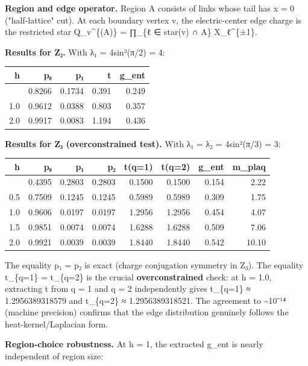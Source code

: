 \textbf{Region and edge operator.} Region A consists of links whose tail has x = 0 ("half-lattice" cut). At each boundary vertex v, the electric-center edge charge is the restricted star Q\_v\^{}\{(A)\} = ∏\_\{ℓ ∈ star(v) ∩ A\} X\_ℓ\^{}\{±1\}.

\textbf{Results for Z₂.} With λ₁ = 4sin²(π/2) = 4:

{\def\LTcaptype{none} %
\begin{longtable}[]{@{}rrrrr@{}}
\toprule\noalign{}
h & p₀ & p₁ & t & g\_ent \\
\midrule\noalign{}
\endhead
\bottomrule\noalign{}
\endlastfoot
0.5 & 0.8266 & 0.1734 & 0.391 & 0.249 \\
1.0 & 0.9612 & 0.0388 & 0.803 & 0.357 \\
2.0 & 0.9917 & 0.0083 & 1.194 & 0.436 \\
\end{longtable}
}

\textbf{Results for Z₃ (overconstrained test).} With λ₁ = λ₂ = 4sin²(π/3) = 3:

{\def\LTcaptype{none} %
\begin{longtable}[]{@{}rrrrrrrr@{}}
\toprule\noalign{}
h & p₀ & p₁ & p₂ & t(q=1) & t(q=2) & g\_ent & m\_plaq \\
\midrule\noalign{}
\endhead
\bottomrule\noalign{}
\endlastfoot
0.2 & 0.4395 & 0.2803 & 0.2803 & 0.1500 & 0.1500 & 0.154 & 2.22 \\
0.5 & 0.7509 & 0.1245 & 0.1245 & 0.5989 & 0.5989 & 0.309 & 1.75 \\
1.0 & 0.9606 & 0.0197 & 0.0197 & 1.2956 & 1.2956 & 0.454 & 4.07 \\
1.5 & 0.9851 & 0.0074 & 0.0074 & 1.6288 & 1.6288 & 0.509 & 7.06 \\
2.0 & 0.9921 & 0.0039 & 0.0039 & 1.8440 & 1.8440 & 0.542 & 10.10 \\
\end{longtable}
}

The equality p₁ = p₂ is exact (charge conjugation symmetry in Z₃). The equality t\_\{q=1\} = t\_\{q=2\} is the crucial \textbf{overconstrained} check: at h = 1.0, extracting t from q = 1 and q = 2 independently gives t\_\{q=1\} ≈ 1.2956389318579 and t\_\{q=2\} ≈ 1.2956389318521. The agreement to \textasciitilde10⁻¹⁴ (machine precision) confirms that the edge distribution genuinely follows the heat-kernel/Laplacian form.

\textbf{Region-choice robustness.} At h = 1, the extracted g\_ent is nearly independent of region size:


